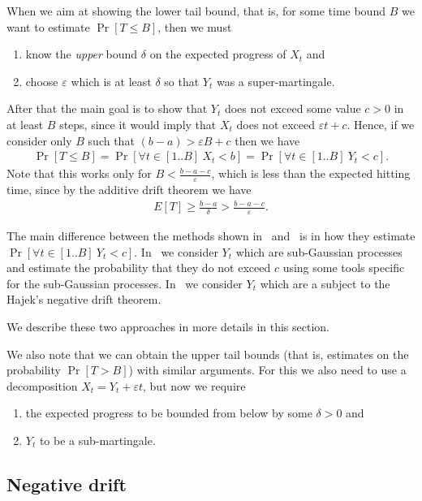 \documentclass[12pt, a4paper]{article}
\theoremstyle{remark}
\newcommand{\eps}{\varepsilon}
\begin{document}
When we aim at showing the lower tail bound, that is, for some time bound $B$ we want to estimate $\Pr[T \le B]$, then we must
\begin{enumerate}
    \item know the \emph{upper} bound $\delta$ on the expected progress of $X_t$ and
    \item choose $\eps$ which is at least $\delta$ so that $Y_t$ was a super-martingale.
\end{enumerate}
After that the main goal is to show that $Y_t$ does not exceed some value $c > 0$ in at least $B$ steps, since it would imply that $X_t$ does not exceed $\eps t + c$. Hence, if we consider only $B$ such that $(b - a) > \eps B + c$  then we have 
\begin{align*}
    \Pr[T \le B] = \Pr[\forall t \in[1..B] \  X_t < b] = \Pr[\forall t \in[1..B] \  Y_t < c].
\end{align*}
Note that this works only for $B < \frac{b - a - c}{\eps}$, which is less than the expected hitting time, since by the additive drift theorem we have
\begin{align*}
    E[T] \ge \frac{b - a}{\delta} > \frac{b - a - c}{\eps}.
\end{align*}

The main difference between the methods shown in~\cite{Kotzing16} and~\cite{AntipovDK19} is in how they estimate $\Pr[\forall t \in[1..B] \  Y_t < c]$. In~\cite{Kotzing16} we consider $Y_t$ which are sub-Gaussian processes and estimate the probability that they do not exceed $c$ using some tools specific for the sub-Gaussian processes. In~\cite{AntipovDK19} we consider $Y_t$ which are a subject to the Hajek's negative drift theorem. 

We describe these two approaches in more details in this section.

We also note that we can obtain the upper tail bounds (that is, estimates on the probability $\Pr[T > B]$) with similar arguments. For this we also need to use a decomposition $X_t = Y_t + \eps t$, but now we require
\begin{enumerate}
    \item the expected progress to be bounded from below by some $\delta > 0$ and
    \item $Y_t$ to be a sub-martingale.
\end{enumerate}  

\subsection{Negative drift}
\end{document}

